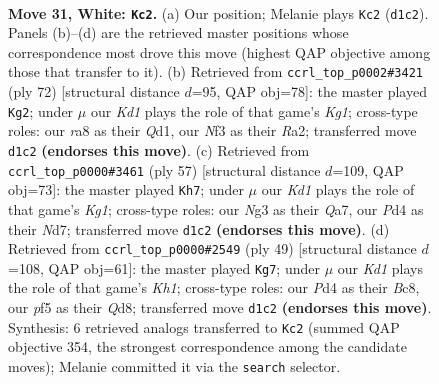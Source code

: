 \documentclass[11pt]{article}
\begin{document}
\clearpage

\begin{figure}[p]\centering
\begin{subfigure}{0.46\textwidth}\centering
\resizebox{\linewidth}{!}{%
\newchessgame
\chessboard[
  setfen={rn3rk1/2pnq2p/1p2p1p1/p3Pp2/P2P1P1P/1RP2NN1/6PQ/3K1R2 w - - 3 31},
  showmover=false,
  pgfstyle=straightmove, color=movearrow, markmove={d1-c2}
]}
\caption{}
\end{subfigure}\hfill
\begin{subfigure}{0.46\textwidth}\centering
\resizebox{\linewidth}{!}{%
\newchessgame
\chessboard[
  setfen={3q1rk1/R1p2rp1/1p1ppnnp/1P2p3/2P1P2P/3P1NP1/R4P1N/3Q2K1 w - - 3 37},
  showmover=false,
  pgfstyle=straightmove, color=movearrow, markmove={g1-g2}
]}
\caption{}
\end{subfigure}
\\[4pt]
\begin{subfigure}{0.46\textwidth}\centering
\resizebox{\linewidth}{!}{%
\newchessgame
\chessboard[
  setfen={1r4k1/q2nnpp1/p1ppr2p/4p3/PP2P3/1NQPP2P/2R3PK/1R3N2 b - - 4 29},
  showmover=false,
  pgfstyle=straightmove, color=movearrow, markmove={g8-h7}
]}
\caption{}
\end{subfigure}\hfill
\begin{subfigure}{0.46\textwidth}\centering
\resizebox{\linewidth}{!}{%
\newchessgame
\chessboard[
  setfen={2bq1r1k/1p1n1p2/r2p2pn/1NpPp2p/P1P1P3/R4N1P/2B2PP1/3Q1RK1 b - - 1 25},
  showmover=false,
  pgfstyle=straightmove, color=movearrow, markmove={h8-g7}
]}
\caption{}
\end{subfigure}
\caption{\textbf{Move 31, White: \texttt{Kc2}.} (a) Our position; Melanie plays \texttt{Kc2} (\texttt{d1c2}). Panels (b)--(d) are the retrieved master positions whose correspondence most drove this move (highest QAP objective among those that transfer to it). (b) Retrieved from \texttt{ccrl\_top\_p0002\#3421} (ply 72) [structural distance $d$=95, QAP obj=78]: the master played \texttt{Kg2}; under $\mu$ our \emph{Kd1} plays the role of that game's \emph{Kg1}; cross-type roles: our \emph{r}a8 as their \emph{Q}d1, our \emph{N}f3 as their \emph{R}a2; transferred move \texttt{d1c2} \textbf{(endorses this move)}. (c) Retrieved from \texttt{ccrl\_top\_p0000\#3461} (ply 57) [structural distance $d$=109, QAP obj=73]: the master played \texttt{Kh7}; under $\mu$ our \emph{Kd1} plays the role of that game's \emph{Kg1}; cross-type roles: our \emph{N}g3 as their \emph{Q}a7, our \emph{P}d4 as their \emph{N}d7; transferred move \texttt{d1c2} \textbf{(endorses this move)}. (d) Retrieved from \texttt{ccrl\_top\_p0000\#2549} (ply 49) [structural distance $d$=108, QAP obj=61]: the master played \texttt{Kg7}; under $\mu$ our \emph{Kd1} plays the role of that game's \emph{Kh1}; cross-type roles: our \emph{P}d4 as their \emph{B}c8, our \emph{p}f5 as their \emph{Q}d8; transferred move \texttt{d1c2} \textbf{(endorses this move)}. Synthesis: 6 retrieved analogs transferred to \texttt{Kc2} (summed QAP objective 354, the strongest correspondence among the candidate moves); Melanie committed it via the \texttt{search} selector.}
\label{fig:thought-m60}
\end{figure}
\end{document}
